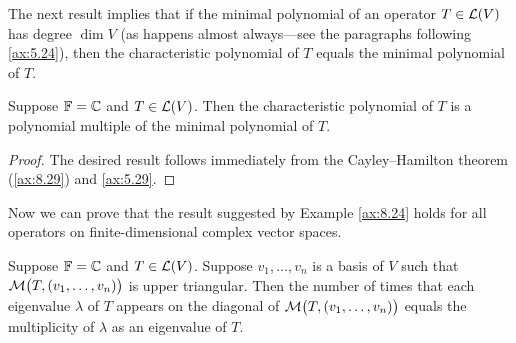 The next result implies that if the minimal polynomial of an operator
$T\in\mathcal{L}(V)$ has degree $\dim V$ (as happens almost always---see the
paragraphs following \ref{ax:5.24}), then the characteristic polynomial of $T$
equals the minimal polynomial of $T$.

\begin{result}\label{ax:8.30}
Suppose $\mathbb{F}=\mathbb{C}$ and $T\in\mathcal{L}(V)$. Then the characteristic polynomial of $T$ is
a polynomial multiple of the minimal polynomial of $T$.
\end{result}

\begin{proof}
The desired result follows immediately from the Cayley--Hamilton theorem
(\ref{ax:8.29}) and \ref{ax:5.29}.
\end{proof}

Now we can prove that the result suggested by Example \ref{ax:8.24} holds for
all operators on finite-dimensional complex vector spaces.

\begin{result}\label{ax:8.31}
Suppose $\mathbb{F}=\mathbb{C}$ and $T\in\mathcal{L}(V)$. Suppose $v_1,\dots,v_n$ is a basis of $V$
such that $\mathcal{M}\bigl(T,(v_1,\dots,v_n)\bigr)$ is upper triangular. Then the
number of times that each eigenvalue $\lambda$ of $T$ appears on the diagonal of
$\mathcal{M}\bigl(T,(v_1,\dots,v_n)\bigr)$ equals the multiplicity of $\lambda$ as an
eigenvalue of $T$.
\end{result}


